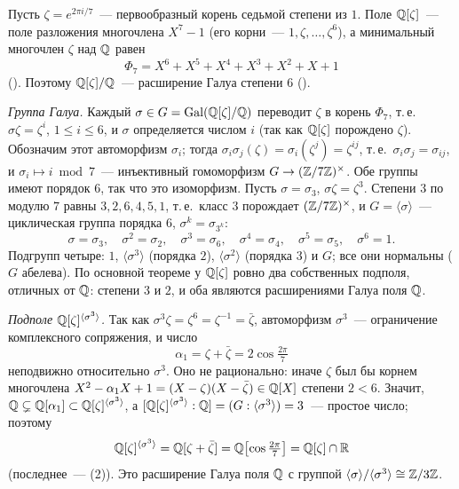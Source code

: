 \begin{example}[3.22]
Пусть $\zeta=e^{2\pi i/7}$~--- первообразный корень седьмой степени из $1$. Поле $\mathbb Q[\zeta]$~--- поле разложения многочлена
$X^7-1$ (его корни~--- $1,\zeta,\dots,\zeta^6$), а минимальный многочлен $\zeta$ над $\mathbb Q$ равен
\[
\Phi_7=X^6+X^5+X^4+X^3+X^2+X+1
\]
(). Поэтому $\mathbb Q[\zeta]/\mathbb Q$~--- расширение Галуа степени $6$ ().

\emph{Группа Галуа.} Каждый $\sigma\in G=\operatorname{Gal}(\mathbb Q[\zeta]/\mathbb Q)$ переводит $\zeta$ в корень $\Phi_7$, т.\,е.\ $\sigma\zeta=\zeta^i$,
$1\le i\le6$, и $\sigma$ определяется числом $i$ (так как $\mathbb Q[\zeta]$ порождено $\zeta$). Обозначим этот автоморфизм
$\sigma_i$; тогда $\sigma_i\sigma_j(\zeta)=\sigma_i(\zeta^j)=\zeta^{ij}$, т.\,е.\ $\sigma_i\sigma_j=\sigma_{ij}$, и $\sigma_i\mapsto
i\bmod7$~--- инъективный гомоморфизм $G\to(\mathbb Z/7\mathbb Z)^\times$. Обе группы имеют порядок $6$, так что это изоморфизм. Пусть
$\sigma=\sigma_3$, $\sigma\zeta=\zeta^3$. Степени $3$ по модулю $7$ равны $3,2,6,4,5,1$, т.\,е.\ класс $3$ порождает
$(\mathbb Z/7\mathbb Z)^\times$, и $G=\langle\sigma\rangle$~--- циклическая группа порядка $6$, $\sigma^k=\sigma_{3^k}$:
\[
\sigma=\sigma_3,\quad\sigma^2=\sigma_2,\quad\sigma^3=\sigma_6,\quad\sigma^4=\sigma_4,\quad\sigma^5=\sigma_5,\quad\sigma^6=1 .
\]
Подгрупп четыре: $1$, $\langle\sigma^3\rangle$ (порядка $2$), $\langle\sigma^2\rangle$ (порядка $3$) и $G$; все они нормальны
($G$ абелева). По основной теореме у $\mathbb Q[\zeta]$ ровно два собственных подполя, отличных от $\mathbb Q$: степени $3$ и $2$, и оба
являются расширениями Галуа поля $\mathbb Q$.

\emph{Подполе $\mathbb Q[\zeta]^{\langle\sigma^3\rangle}$.} Так как $\sigma^3\zeta=\zeta^6=\zeta^{-1}=\bar\zeta$, автоморфизм $\sigma^3$~---
ограничение комплексного сопряжения, и число
\[
\alpha_1=\zeta+\bar\zeta=2\cos\tfrac{2\pi}7
\]
неподвижно относительно $\sigma^3$. Оно не рационально: иначе $\zeta$ был бы корнем многочлена
$X^2-\alpha_1X+1=(X-\zeta)(X-\bar\zeta)\in\mathbb Q[X]$ степени $2<6$. Значит, $\mathbb Q\subsetneq\mathbb Q[\alpha_1]\subset\mathbb Q[\zeta]^{\langle\sigma^3\rangle}$,
а $[\mathbb Q[\zeta]^{\langle\sigma^3\rangle}:\mathbb Q]=(G:\langle\sigma^3\rangle)=3$~--- простое число; поэтому
\[
\mathbb Q[\zeta]^{\langle\sigma^3\rangle}=\mathbb Q[\zeta+\bar\zeta]=\mathbb Q\bigl[\cos\tfrac{2\pi}7\bigr]=\mathbb Q[\zeta]\cap\mathbb R
\]
(последнее~--- (2)). Это расширение Галуа поля $\mathbb Q$ с группой $\langle\sigma\rangle/\langle\sigma^3\rangle\cong\mathbb Z/3\mathbb Z$.


\end{example}
